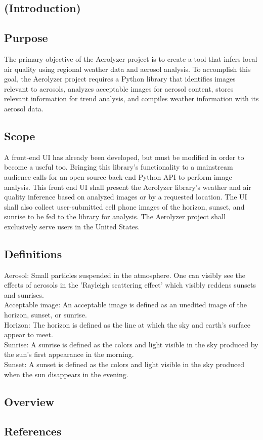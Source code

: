 \documentclass[journal,10pt,draftclsnofoot,onecolumn]{IEEEtran}
\begin{document}
\begin{singlespace}

\section{(Introduction)}

\subsection{Purpose}
The primary objective of the Aerolyzer project is to create a tool that infers local air quality using regional weather data and aerosol analysis. To accomplish this goal, the Aerolyzer project requires a Python library that identifies images relevant to aerosols, analyzes acceptable images for aerosol content, stores relevant information for trend analysis, and compiles weather information with its aerosol data.

\subsection{Scope}
A front-end UI has already been developed, but must be modified in order to become a useful too. Bringing this library's functionality to a mainstream audience calls for an open-source back-end Python API to perform image analysis. This front end UI shall present the Aerolyzer library's weather and air quality inference based on analyzed images or by a requested location. The UI shall also collect user-submitted cell phone images of the horizon, sunset, and sunrise to be fed to the library for analysis. The Aerolyzer project shall exclusively serve users in the United States.

\subsection{Definitions}
Aerosol: Small particles suspended in the atmosphere. One can visibly see the effects of aerosols in the 'Rayleigh scattering effect' which visibly reddens sunsets and sunrises. \\

Acceptable image: An acceptable image is defined as an unedited image of the horizon, sunset, or sunrise.\\

Horizon: The horizon is defined as the line at which the sky and earth's surface appear to meet.\\

Sunrise: A sunrise is defined as the colors and light visible in the sky produced by the sun's first appearance in the morning.\\

Sunset: A sunset is defined as the colors and light visible in the sky produced when the sun disappears in the evening.\\

\subsection{Overview}

\subsection{References}
\nocite{*}




\end{singlespace}
\end{document}
